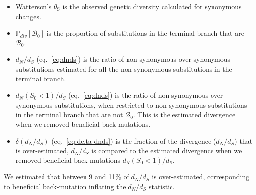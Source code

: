 \documentclass[12pt]{article}
\newcommand{\proba}{\mathbb{P}}
\newcommand{\dn}{d_N}
\newcommand{\ds}{d_S}
\newcommand{\dnds}{\dn / \ds}
\newcommand{\Sphy}{S_{0}}
\newcommand{\SphyBen}{\mathcal{B}_0}
\newcommand{\thetaSyn}{\theta_{\text{S}}}
\begin{document}
    \begin{itemize}
        \item Watterson's $\thetaSyn$ is the observed genetic diversity calculated for synonymous changes.
        \item $\proba_{div}[\SphyBen]$ is the proportion of substitutions in the terminal branch that are $\SphyBen$.
        \item $\dnds$ (eq.~\ref{eq:dnds}) is the ratio of non-synonymous over synonymous substitutions estimated for all the non-synonymous substitutions in the terminal branch.
        \item $\dn(\Sphy < 1) / \ds$ (eq.~\ref{eq:dnds}) is the ratio of non-synonymous over synonymous substitutions, when restricted to non-synonymous substitutions in the terminal branch that are not $\SphyBen$.
        This is the estimated divergence when we removed beneficial back-mutations.
        \item $\delta(\dnds)$ (eq.~\ref{eq:delta-dnds}) is the fraction of the divergence ($\dnds$) that is over-estimated, $\dnds$ is compared to the estimated divergence when we removed beneficial back-mutations $\dn(\Sphy < 1) / \ds$.
    \end{itemize}
    We estimated that between 9 and 11\% of $\dnds$ is over-estimated, corresponding to beneficial back-mutation inflating the $\dnds$ statistic.

    \newpage
\end{document}
